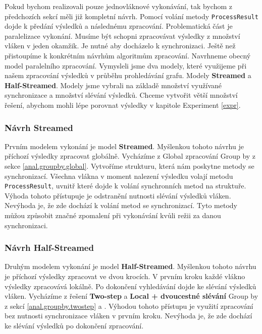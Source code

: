 Pokud bychom realizovali pouze jednovláknové vykonávání, tak bychom z předchozích sekcí měli již kompletní návrh.
Pomocí volání metody \texttt{ProcessResult} dojde k předání výsledků a následnému zpracování.
Problematická část je paralelizace vykonání.
Musíme být schopni zpracovávat výsledky z množství vláken v jeden okamžik.
Je nutné aby docházelo k synchronizaci.
Ještě než přistoupíme k konkrétním návrhům algoritmům zpracování.
Navrhneme obecný model paralelního zpracování.
Vymysleli jsme dva modely, které využijeme při našem zpracování výsledků v průběhu prohledávání grafu.
Modely \textbf{Streamed} a \textbf{Half-Streamed}.
Modely jsme vybrali na základě množství využívané synchronizace a množství slévání výsledků.
Chceme vytvořit větší množství řešení, abychom mohli lépe porovnat výsledky v kapitole Experiment \ref{expr}.

\subsubsection{Návrh Streamed}

Prvním modelem vykonání je model \textbf{Streamed}.
Myšlenkou tohoto návrhu je příchozí výsledky zpracovat globálně.
Vycházíme z Global zpracování Group by z sekce \ref{anal.groupby.global}.
Vytvoříme strukturu, která nám poskytne metody se synchronizací.
Všechna vlákna v moment nalezení výsledku volají metodu \texttt{ProcessResult}, uvnitř které dojde k volání synchronních metod na struktuře.
Výhoda tohoto přístupuje je odstranění nutnosti slévání výsledků vláken.
Nevýhoda je, že zde dochází k volání metod se synchronizací.
Tyto metody můžou způsobit značné zpomalení při vykonávání kvůli režii za danou synchronizaci.

\subsubsection{Návrh Half-Streamed}

Druhým modelem vykonání je model \textbf{Half-Streamed}.
Myšlenkou tohoto návrhu je příchozí výsledky zpracovat ve dvou krocích.
V prvním kroku každé vlákno výsledky zpracovává lokálně.
Po dokončení vyhledávání dojde ke slévání výsledků vláken.
Vycházíme z řešení \textbf{Two-step} a \textbf{Local + dvoucestné slévání} Group by z sekcí \ref{anal.groupby.twostep} a \label{anal.groupby.local}.
Výhodou tohoto přístupu je využití zpracování bez nutnosti synchronizace vláken v prvním kroku.
Nevýhoda je, že zde dochází ke slévání výsledků po dokončení zpracování.

